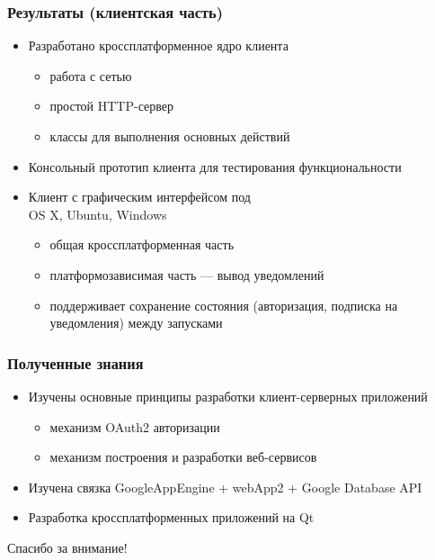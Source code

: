 \documentclass[10pt,pdf,hyperref={unicode}]{beamer}
\begin{document}
    \begin{frame}\frametitle{Результаты (клиентская часть)}
        \begin{itemize}%
            \item Разработано кроссплатформенное ядро клиента            	
            \begin{itemize}
                \item работа с сетью
                \item простой HTTP-сервер
                \item классы для выполнения основных действий
            \end{itemize}
            \pause
            \item Консольный прототип клиента для тестирования функциональности
            \pause
            \item Клиент с графическим интерфейсом под \\ OS X, Ubuntu, Windows
            \begin{itemize}
                \item общая кроссплатформенная часть
                \item платформозависимая часть --- вывод уведомлений
                \item поддерживает сохранение состояния (авторизация, подписка
                на уведомления) между запусками
            \end{itemize}
        \end{itemize}
    \end{frame}

    \begin{frame}\frametitle{Полученные знания}
        \begin{itemize}%
            \item	Изучены основные принципы разработки клиент-серверных приложений
            \begin{itemize}
                \item механизм OAuth2 авторизации
                \item механизм построения и разработки веб-сервисов
            \end{itemize}            
            \item	Изучена связка GoogleAppEngine + webApp2 + Google Database API
            \item	Разработка кроссплатформенных приложений на Qt
        \end{itemize}
    \end{frame}

    \begin{frame}
        \begin{center}
            Спасибо за внимание!
        \end{center}
    \end{frame}
\end{document}
